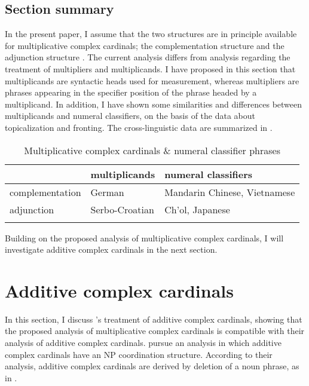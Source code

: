 \documentclass[output=paper]{langscibook}
\begin{document}
\subsection{Section summary}\label{tat:sec:sum}
In the present paper, I assume that the two structures are in principle available for multiplicative complex cardinals; the complementation structure  and the adjunction structure . The current analysis differs from  analysis regarding the treatment of multipliers and multiplicands. I have proposed in this section that multiplicands are syntactic heads used for measurement, whereas multipliers are phrases appearing in the specifier position of the phrase headed by a multiplicand. In addition, I have shown some similarities and differences between multiplicands and numeral classifiers, on the basis of the data about topicalization and fronting. The cross-linguistic data are summarized in .

\begin{table}
\caption{Multiplicative complex cardinals \& numeral classifier phrases}
\label{tat:tab:1:frequencies}
 \begin{tabular}{lll}
  \lsptoprule
            & multiplicands & numeral classifiers\\
  \midrule
  complementation  & German &  Mandarin Chinese, Vietnamese\\
  adjunction  &   Serbo-Croatian &  Ch'ol, Japanese\\
  \lspbottomrule
 \end{tabular}
\end{table}

Building on the proposed analysis of multiplicative complex cardinals, I will investigate additive complex cardinals in the next section. 

\section{Additive complex cardinals}\label{tat:sec:add}
In this section, I discuss \citeauthor{IoninMatushansky2018}'s treatment of additive complex cardinals, showing that the proposed analysis of multiplicative complex cardinals is compatible with their analysis of additive complex cardinals. \citeauthor{IoninMatushansky2018} pursue an analysis in which additive complex cardinals have an NP coordination structure. According to their analysis, additive complex cardinals are derived by deletion of a noun phrase, as in .
\end{document}
